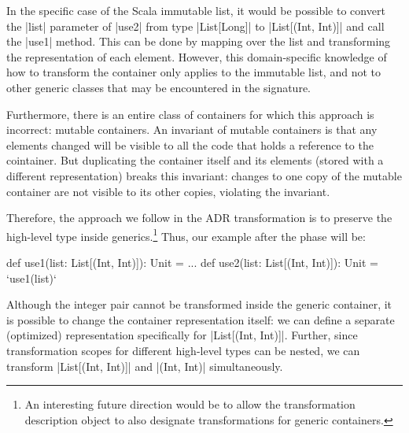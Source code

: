In the specific case of the Scala immutable list, it would be possible to convert the |list| parameter of |use2| from type |List[Long]| to |List[(Int, Int)]| and call the |use1| method. This can be done by mapping over the list and transforming the representation of each element. However, this domain-specific knowledge of how to transform the container only applies to the immutable list, and not to other generic classes that may be encountered in the signature.

Furthermore, there is an entire class of containers for which this approach is incorrect: mutable containers. An invariant of mutable containers is that any elements changed will be visible to all the code that holds a reference to the cointainer. But duplicating the container itself and its elements (stored with a different representation) breaks this invariant: changes to one copy of the mutable container are not visible to its other copies, violating the invariant.

Therefore, the approach we follow in the ADR transformation is to
preserve the high-level type inside generics.\footnote{An interesting
  future direction would be to allow the transformation description
  object to also designate transformations for generic containers.}
Thus, our example after the \commit{} phase will be:

\begin{lstlisting-nobreak}
def use1(list: List[(Int, Int)]): Unit = ...
def use2(list: List[(Int, Int)]): Unit = `use1(list)`
\end{lstlisting-nobreak}

Although the integer pair cannot be transformed inside the generic
container, it is possible to change the container representation
itself: we can define a separate (optimized) representation
specifically for |List[(Int, Int)]|. Further, since transformation
scopes for different high-level types can be nested, we can transform
|List[(Int, Int)]| and |(Int, Int)| simultaneously.



